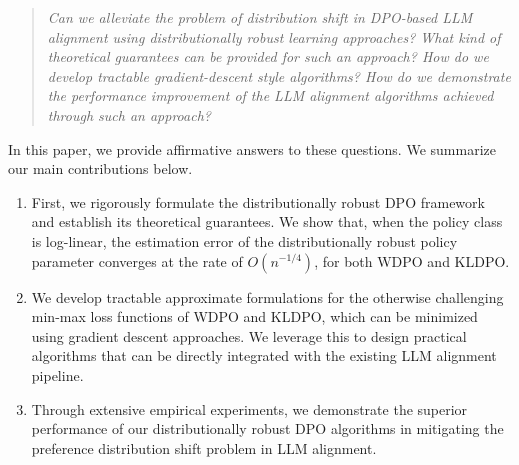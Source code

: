 \begin{quote}
    \textit{Can we alleviate the problem of distribution shift in DPO-based LLM alignment using distributionally robust learning approaches? What kind of theoretical guarantees can be provided for such an approach? How do we develop tractable gradient-descent style algorithms? How do we demonstrate the performance improvement of the LLM alignment algorithms achieved through such an approach?}
\end{quote}

In this paper, we provide affirmative answers to these questions. We summarize our main contributions below. 
\begin{enumerate}
    \item First, we rigorously formulate the distributionally robust DPO framework and establish its theoretical guarantees. We show that, when the policy class is log-linear, the estimation error of the distributionally robust policy parameter converges at the rate of $O(n^{-1/4})$, for both WDPO and KLDPO.
    \item We develop tractable approximate formulations for the otherwise challenging min-max loss functions of WDPO and KLDPO, which can be minimized using gradient descent approaches. We leverage this to design practical algorithms that can be directly integrated with the existing LLM alignment pipeline.  
    \item Through extensive empirical experiments, we demonstrate the superior performance of our distributionally robust DPO algorithms in mitigating the preference distribution shift problem in LLM alignment.   
\end{enumerate}









